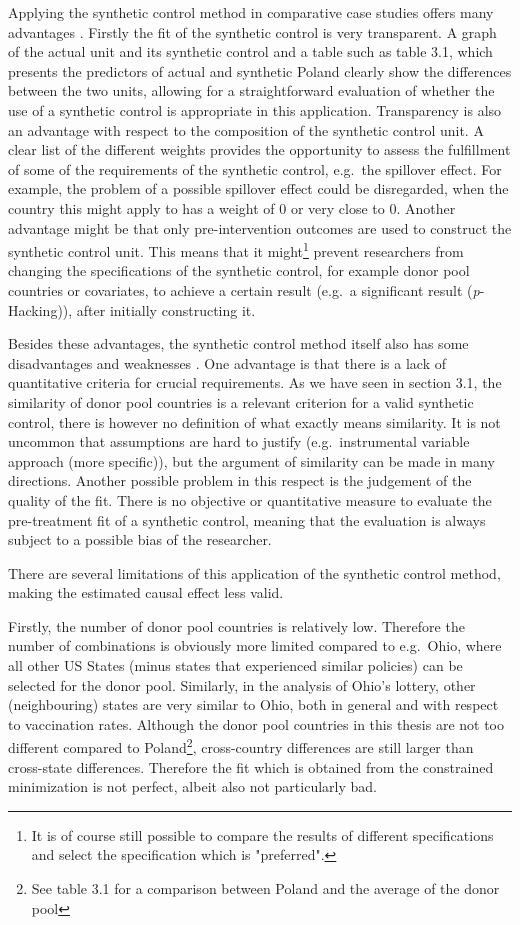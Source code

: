 \documentclass{scrbook}
\begin{document}
Applying the synthetic control method in comparative case studies offers
many advantages \parencite{abadie_using_2021}. Firstly the fit of the
synthetic control is very transparent. A graph of the actual unit and
its synthetic control and a table such as table 3.1, which presents the
predictors of actual and synthetic Poland clearly show the differences
between the two units, allowing for a straightforward evaluation of
whether the use of a synthetic control is appropriate in this
application. Transparency is also an advantage with respect to the
composition of the synthetic control unit. A clear list of the different
weights provides the opportunity to assess the fulfillment of some of
the requirements of the synthetic control, e.g.~the spillover effect.
For example, the problem of a possible spillover effect could be
disregarded, when the country this might apply to has a weight of 0 or
very close to 0. Another advantage might be that only pre-intervention
outcomes are used to construct the synthetic control unit. This means
that it
might\footnote{It is of course still possible to compare the results of different specifications and select the specification which is "preferred".}
prevent researchers from changing the specifications of the synthetic
control, for example donor pool countries or covariates, to achieve a
certain result (e.g.~a significant result (\textit{p}-Hacking)), after
initially constructing it.

Besides these advantages, the synthetic control method itself also has
some disadvantages and weaknesses \parencite{bouttell_synthetic_2018}.
One advantage is that there is a lack of quantitative criteria for
crucial requirements. As we have seen in section 3.1, the similarity of
donor pool countries is a relevant criterion for a valid synthetic
control, there is however no definition of what exactly means
similarity. It is not uncommon that assumptions are hard to justify
(e.g.~instrumental variable approach (more specific)), but the argument
of similarity can be made in many directions. Another possible problem
in this respect is the judgement of the quality of the fit. There is no
objective or quantitative measure to evaluate the pre-treatment fit of a
synthetic control, meaning that the evaluation is always subject to a
possible bias of the researcher.

There are several limitations of this application of the synthetic
control method, making the estimated causal effect less valid.

Firstly, the number of donor pool countries is relatively low. Therefore
the number of combinations is obviously more limited compared to
e.g.~Ohio, where all other US States (minus states that experienced
similar policies) can be selected for the donor pool. Similarly, in the
analysis of Ohio's lottery, other (neighbouring) states are very similar
to Ohio, both in general and with respect to vaccination rates. Although
the donor pool countries in this thesis are not too different compared
to
Poland\footnote{See table 3.1 for a comparison between Poland and the average of the donor pool},
cross-country differences are still larger than cross-state differences.
Therefore the fit which is obtained from the constrained minimization is
not perfect, albeit also not particularly bad.
\end{document}
